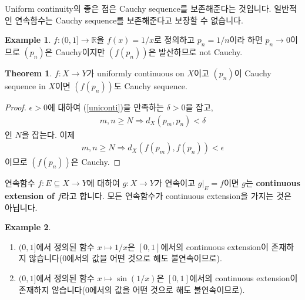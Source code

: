 \documentclass[12pt]{article}
\theoremstyle{definition}
\newtheorem{thm}{Theorem}[section]
\newtheorem*{ex}{Example}
\def\RR{\mathbb{R}}
\def\eps{\epsilon}
\begin{document}
Uniform continuity의 좋은 점은 Cauchy sequence를 보존해준다는 것입니다. 일반적인 연속함수는 Cauchy sequence를 보존해준다고 보장할 수 없습니다.

\begin{ex}
	\(f: (0, 1] \rightarrow \RR\)을 \(f(x) = 1/x\)로 정의하고 \(p_n = 1/n\)이라 하면 \(p_n \rightarrow 0\)이므로 \((p_n)\)은 Cauchy이지만 \((f(p_n))\)은 발산하므로 not Cauchy.
\end{ex}

\begin{thm} \label{Cauchy}
	\(f: X \rightarrow Y\)가 uniformly continuous on \(X\)이고 \((p_n)\)이 Cauchy sequence in \(X\)이면 \((f(p_n))\)도 Cauchy sequence.
\end{thm}
\begin{proof}
	\(\eps > 0\)에 대하여 (\ref{uniconti})을 만족하는 \(\delta > 0\)을 잡고,
	\begin{gather*}
		m, n \ge N \Longrightarrow d_X (p_m, p_n) < \delta
	\end{gather*}
	인 \(N\)을 잡는다. 이제
	\begin{gather*}
		m, n \ge N \Longrightarrow d_X (f(p_m), f(p_n)) < \eps
	\end{gather*}
	이므로 \((f(p_n))\)은 Cauchy.
\end{proof}

연속함수 \(f: E \subseteq X \rightarrow Y\)에 대하여 \(g: X \rightarrow Y\)가 연속이고 \(g \vert_E = f\)이면 \(g\)는 \textbf{continuous extension of \(f\)}라고 합니다. 모든 연속함수가 continuous extension을 가지는 것은 아닙니다.

\begin{ex}
	\quad
	\begin{enumerate} [label=(\alph*), leftmargin=2\parindent]
		\item
		\((0, 1]\)에서 정의된 함수 \(x \mapsto 1/x\)은 \([0, 1]\)에서의 continuous extension이 존재하지 않습니다(\(0\)에서의 값을 어떤 것으로 해도 불연속이므로).
		\item
		\((0, 1]\)에서 정의된 함수 \(x \mapsto \sin(1/x)\)은 \([0, 1]\)에서의 continuous extension이 존재하지 않습니다(\(0\)에서의 값을 어떤 것으로 해도 불연속이므로).
	\end{enumerate}
\end{ex}
\end{document}
